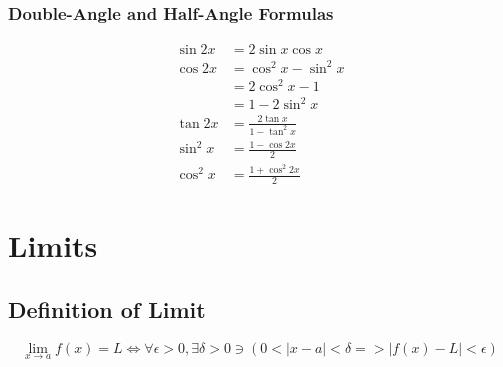 \documentclass[12pt]{article}
\begin{document}
\subsubsection{Double-Angle and Half-Angle Formulas}

\begin{align*}
  \sin 2x &= 2 \sin x \cos x\\
  \cos 2x &= \cos^2 x - \sin^2 x\\
          &= 2 \cos^2 x - 1\\
          &= 1 - 2 \sin^2 x\\
  \tan 2x &= \frac{2 \tan x}{1 - \tan^2 x}\\
  \sin^2 x &= \frac{1-\cos 2x}{2}\\
  \cos^2 x &= \frac{1+\cos^2 2x}{2}
\end{align*}

\section{Limits}

\subsection{Definition of Limit}

\[
  \lim_{x \to a} f(x) = L \iff \forall \epsilon > 0, \exists \delta > 0 \ni (0 < |x - a| < \delta => |f(x)-L| < \epsilon)
\]
\end{document}
